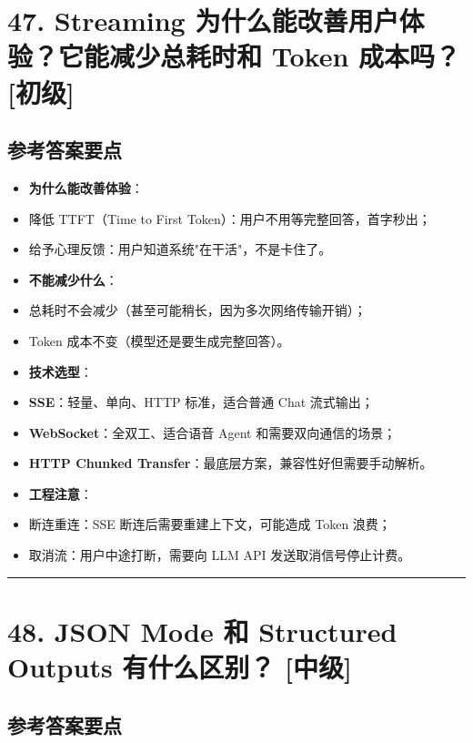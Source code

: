\documentclass[9pt,a4paper,twocolumn]{ctexart}
\newcommand{\lvchu}{\usebox{\badgechubox}}
\newcommand{\lvzhong}{\usebox{\badgezhongbox}}
\def\lvchu{[初级]}%
\def\lvzhong{[中级]}%
\begin{document}
\section*{47. Streaming 为什么能改善用户体验？它能减少总耗时和 Token 成本吗？ \lvchu{}}


\subsection*{参考答案要点}

\begin{itemize}[itemsep=1pt, topsep=2pt]
  \item \textbf{为什么能改善体验}：
  \item 降低 TTFT（Time to First Token）：用户不用等完整回答，首字秒出；
  \item 给予心理反馈：用户知道系统"在干活"，不是卡住了。
  \item \textbf{不能减少什么}：
  \item 总耗时不会减少（甚至可能稍长，因为多次网络传输开销）；
  \item Token 成本不变（模型还是要生成完整回答）。
  \item \textbf{技术选型}：
  \item \textbf{SSE}：轻量、单向、HTTP 标准，适合普通 Chat 流式输出；
  \item \textbf{WebSocket}：全双工、适合语音 Agent 和需要双向通信的场景；
  \item \textbf{HTTP Chunked Transfer}：最底层方案，兼容性好但需要手动解析。
  \item \textbf{工程注意}：
  \item 断连重连：SSE 断连后需要重建上下文，可能造成 Token 浪费；
  \item 取消流：用户中途打断，需要向 LLM API 发送取消信号停止计费。
\end{itemize}


\vspace{2pt}
\noindent\rule{\columnwidth}{0.3pt}\vspace{2pt}



\section*{48. JSON Mode 和 Structured Outputs 有什么区别？ \lvzhong{}}


\subsection*{参考答案要点}
\end{document}
